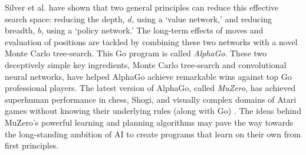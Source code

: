 Silver et al.\cite{b12} have shown that two general principles can reduce this effective search space: reducing the depth, $d$, using a `value network,' and reducing breadth, $b$, using a `policy network.' The long-term effects of moves and evaluation of positions are tackled by combining these two networks with a novel Monte Carlo tree-search. This Go program is called \textit{AlphaGo}. These two deceptively simple key ingredients, Monte Carlo tree-search and convolutional neural networks, have helped AlphaGo achieve remarkable wins against top Go professional players. The latest version of AlphaGo, called \textit{MuZero}, has achieved superhuman performance in chess, Shogi, and visually complex domains of Atari games without knowing their underlying rules (along with Go) \cite{b13}. The ideas behind MuZero's powerful learning and planning algorithms may pave the way towards the long-standing ambition of AI to create programs that learn on their own from first principles. 